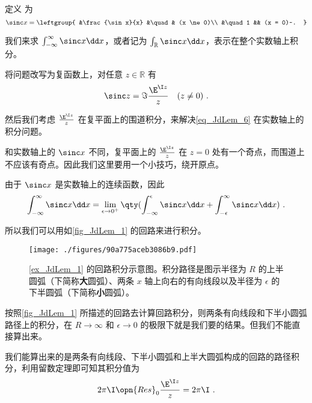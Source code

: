 \begin{example}{}\label{ex_JdLem_1}

定义 为
\begin{equation}
\sinc x = 
\leftgroup{
&\frac{\sin x}{x} &\quad & (x \ne 0)\\
&\quad 1 && (x = 0)~.
}\end{equation}

我们来求 $\int_{-\infty}^{\infty}\sinc x\dd x$，或者记为 $\int_{\mathbb{R}}\sinc x \dd x$，表示在整个实数轴上积分。

将问题改写为复函数上，对任意 $z\in\mathbb{R}$ 有
\begin{equation}\label{eq_JdLem_6}
\sinc z = \Im \frac{\E^{\I z}}{z} \quad  (z \ne 0)~.
\end{equation}

然后我们考虑 $\frac{\E^{\I z}}{z}$ 在复平面上的围道积分，来解决\autoref{eq_JdLem_6} 在实数轴上的积分问题。

和实数轴上的 $\sinc x$ 不同，复平面上的 $\frac{\E^{\I z}}{z}$ 在 $z=0$ 处有一个奇点，而围道上不应该有奇点。因此我们这里要用一个小技巧，绕开原点。

由于 $\sinc x$ 是实数轴上的连续函数，因此
\begin{equation}
\int_{-\infty}^\infty \sinc x \dd x=\lim\limits_{\epsilon\to 0^+}\qty(\int_{-\infty}^\epsilon \sinc x \dd x+\int_{-\epsilon}^\infty \sinc x \dd x)~.
\end{equation}

所以我们可以用如\autoref{fig_JdLem_1} 的回路来进行积分。

\begin{figure}[ht]
\centering
\texttt{[image: ./figures/90a775aceb3086b9.pdf]}
\caption{\autoref{ex_JdLem_1} 的回路积分示意图。积分路径是图示半径为 $R$ 的上半圆弧（下简称\textbf{大}圆弧）、两条 $x$ 轴上向右的有向线段以及半径为 $\epsilon$ 的下半圆弧（下简称\textbf{小}圆弧）。} \label{fig_JdLem_1}
\end{figure}

按照\autoref{fig_JdLem_1} 所描述的回路去计算回路积分，则两条有向线段和下半小圆弧路径上的积分，在 $R\to\infty$ 和 $\epsilon\to 0$ 的极限下就是我们要的结果。但我们不能直接算出来。

我们能算出来的是两条有向线段、下半小圆弧和上半大圆弧构成的回路的路径积分，利用留数定理即可知其积分值为
\begin{equation}\label{eq_JdLem_7}
2\pi\I\opn{Res}_0\frac{\E^{\I z}}{z}=2\pi\I~.
\end{equation}


\end{example}
